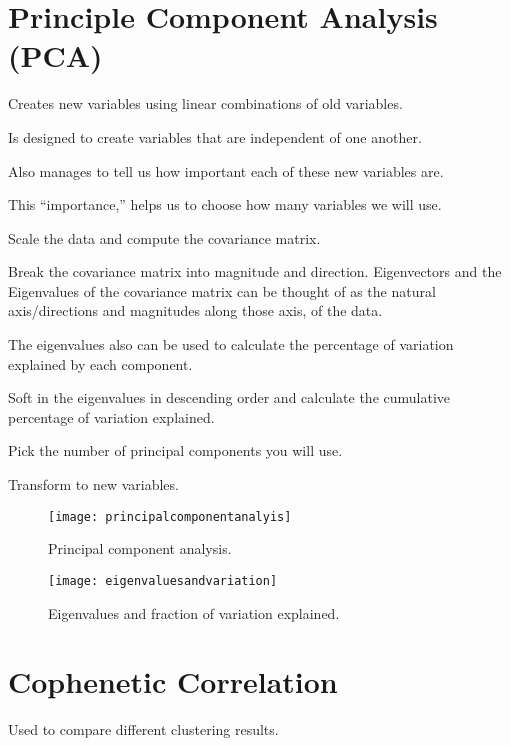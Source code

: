 	\section{Principle Component Analysis (PCA)}
	\begin{bulletedlist}
		\item Creates new variables using linear combinations of old variables.
		\item Is designed to create variables that are independent of one another.
		\item Also manages to tell us how important each of these new variables are.
		\item This ``importance,'' helps us to choose how many variables we will use.
		\item Scale the data and compute the covariance matrix.
		\item Break the covariance matrix into magnitude and direction. Eigenvectors and the Eigenvalues of the covariance matrix can be thought of as the natural axis/directions and magnitudes along those axis, of the data.
		\begin{bulletedlist}
			\item The eigenvalues also can be used to calculate the percentage of variation explained by each component.
		\end{bulletedlist}
		\item Soft in the eigenvalues in descending order and calculate the cumulative percentage of variation explained.
		\item Pick the number of principal components you will use.
		\item Transform to new variables.
	\end{bulletedlist}

	\begin{figure}[htb]
		\centering
		\texttt{[image: principalcomponentanalyis]}
		\caption[Principal component analysis]{Principal component analysis.}
		\label{fig:principalcomponentanalyis}
	\end{figure}
 	\begin{figure}[htb]
		\centering
		\texttt{[image: eigenvaluesandvariation]}
		\caption[Eigenvalues and fraction of variation explained]{Eigenvalues and fraction of variation explained.}
		\label{fig:eigenvaluesandvariation}
	\end{figure}

	\section{Cophenetic Correlation}
Used to compare different clustering results.

